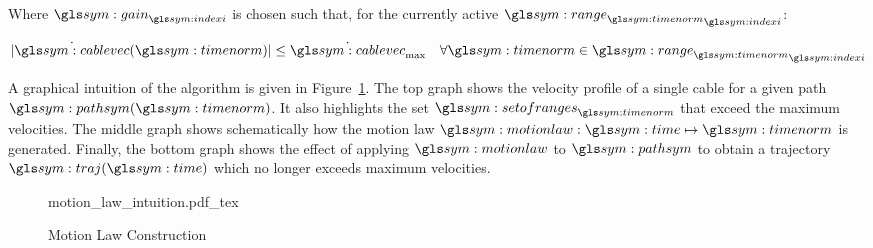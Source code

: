 		Where $\gain_{\indexi}$ is chosen such that, for the currently active
		${\rangetimenorm}_{\indexi}$:

		\begin{equation}
			\abs
			{%
				\dot{\cablevec}(\timenorm)
			}
			\leq \dot{\cablevec}_{\max}
			\quad\forall{\timenorm}\in{\rangetimenorm}_{\indexi}
		\end{equation}

		A graphical intuition of the algorithm is given in
		Figure~\ref{fig:motion_law_graphical_intuition}. The top graph shows the
		velocity profile of a single cable for a given path
		$\pathsym(\timenorm)$. It also highlights the set $\setofrangestimenorm$
		that exceed the maximum velocities. The middle graph shows schematically
		how the motion law $\motionlaw:\timesym \mapsto \timenorm$ is
		generated. Finally, the bottom graph shows the effect of applying
		$\motionlaw$ to $\pathsym$ to obtain a trajectory $\traj(\timesym)$
		which no longer exceeds maximum velocities.

		\begin{figure}[hb]
			\centering
			\def\svgheight{8cm}
			{motion_law_intuition.pdf_tex}
			\caption{Motion Law Construction}%
			\label{fig:motion_law_graphical_intuition}
		\end{figure}


